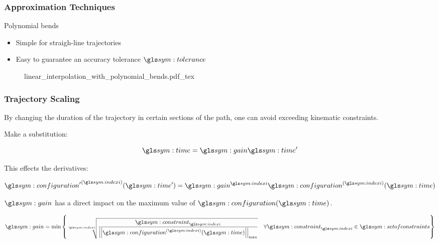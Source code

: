 \documentclass{beamer}
\begin{document}
	\begin{frame}
		\frametitle{Approximation Techniques}

		Polynomial bends

		\begin{itemize}
			\item

				Simple for straigh-line trajectories

			\item

				Easy to guarantee an accuracy tolerance $\tol$
		\end{itemize}

		\begin{figure}[hb]
			\centering
			\def\svgwidth{\columnwidth}
			{linear_interpolation_with_polynomial_bends.pdf_tex}
		\end{figure}
	\end{frame}

	\begin{frame}
		\frametitle{Trajectory Scaling}

		By changing the duration of the trajectory in certain sections of the
		path, one can avoid exceeding kinematic constraints.


		Make a substitution:

		\begin{equation}
			\timesym = \gain\timesym'
			\label{eq:linear_time_scaling}
		\end{equation}

		This effects the derivatives:

		\begin{equation}
			\tdern{\configuration'}{\indexi}(\timesym') = \gain^{\indexi}
				\tdern{\configuration}{\indexi}(\timesym)
		\end{equation}

		$\gain$ has a direct impact on the maximum value of
		$\configuration(\timesym)$.

		\begin{equation}
			\gain = \min
				\left\{
					\sqrt[\indexi]
					{%
						\frac
						{%
							\constraint_{\indexi}
						}
						{%
								\norm
								{%
									\tdern{\configuration}{\indexi}(\timesym)
								}_{\max}
						}
					}
					\quad
					\forall \constraint_{\indexi} \in \setofconstraints
				\right\}
		\end{equation}


	\end{frame}
\end{document}
